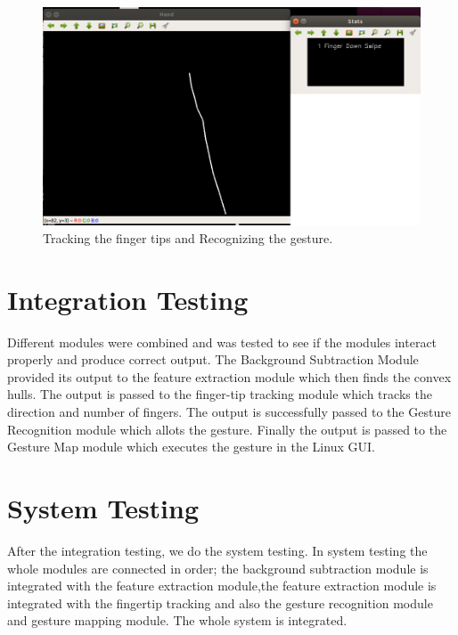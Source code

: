 \documentclass[11pt]{report}
\begin{document}
\begin{figure}[H]
    \includegraphics[width=15cm]{gesture.png}
    
    \caption{Tracking the finger tips and Recognizing the gesture.}
\end{figure}



\section{Integration Testing}

Different modules were combined and was tested to see if the modules interact properly and produce
correct output. The Background Subtraction Module provided its output to the feature extraction module
which then finds the convex hulls. The output is passed to the finger-tip tracking module which tracks the 
direction and number of fingers. The output is successfully passed to the Gesture Recognition module which allots the gesture.
Finally the output is passed to the Gesture Map module which executes the gesture in the Linux GUI.

\section{System Testing}

After the integration testing, we do the system testing. In system testing the whole modules are
connected in order; the background subtraction module is integrated with the feature extraction module,the
feature extraction module is integrated with the fingertip tracking and also the gesture recognition
module and gesture mapping module. The whole system is integrated.
\end{document}
